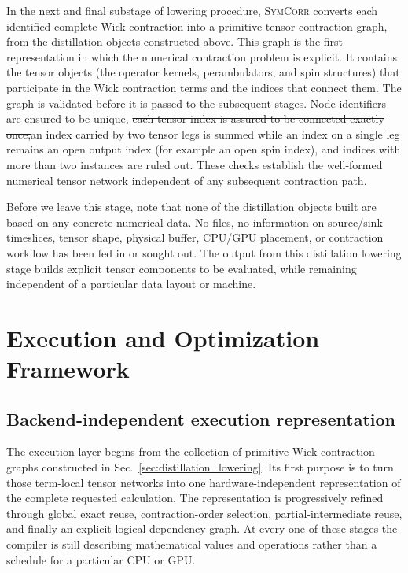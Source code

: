\documentclass[a4paper,fleqn]{cas-dc}
\newcommand{\del}[1]{{\color{red}\sout{#1}}}
\newcommand{\add}[1]{{\color{blue}#1}}
\begin{document}
In the next and final substage of lowering procedure, \textsc{SymCorr} converts each identified complete Wick contraction into a primitive tensor-contraction graph, from the distillation objects constructed above. This graph is the first representation in which the numerical contraction problem is explicit. It contains the tensor objects (the operator kernels, perambulators, and spin structures) that participate in the Wick contraction terms and the indices that connect them. The graph is validated before it is passed to the subsequent stages. Node identifiers are ensured to be unique, \del{each tensor index is assured to be connected exactly once,}\add{an index carried by two tensor legs is summed while an index on a single leg remains an open output index (for example an open spin index),} and indices with more than two instances are ruled out. These checks establish the well-formed numerical tensor network independent of any subsequent contraction path. 

Before we leave this stage, note that none of the distillation objects built are based on any concrete numerical data. No files, no information on source/sink timeslices, tensor shape, physical buffer, CPU/GPU placement, or contraction workflow has been fed in or sought out. The output from this distillation lowering stage builds explicit tensor components to be evaluated, while remaining independent of a particular data layout or machine. 


\section{Execution and Optimization Framework}
\label{sec:execution}


\subsection{Backend-independent execution representation}

The execution layer begins from the collection of primitive Wick-contraction
graphs constructed in Sec.~\ref{sec:distillation_lowering}. Its first purpose is
to turn those term-local tensor networks into one hardware-independent
representation of the complete requested calculation. The representation is
progressively refined through global exact reuse, contraction-order selection,
partial-intermediate reuse, and finally an explicit logical dependency graph.
At every one of these stages the compiler is still describing mathematical
values and operations rather than a schedule for a particular CPU or GPU.
\end{document}
